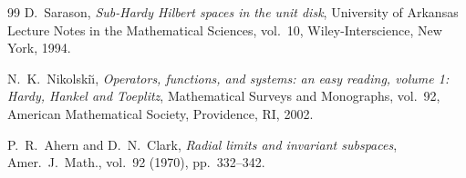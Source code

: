 \documentclass[11pt]{article}
\theoremstyle{plain}
\theoremstyle{definition}
\theoremstyle{remark}
\begin{document}
\begin{thebibliography}{99}
D.~Sarason,
\emph{Sub-Hardy Hilbert spaces in the unit disk},
University of Arkansas Lecture Notes in the Mathematical Sciences, vol.~10,
Wiley-Interscience, New York, 1994.

N.~K.~Nikol\textquotesingle ski\u\i,
\emph{Operators, functions, and systems: an easy reading,
volume 1: Hardy, Hankel and Toeplitz},
Mathematical Surveys and Monographs, vol.~92,
American Mathematical Society, Providence, RI, 2002.

P.~R.~Ahern and D.~N.~Clark,
\emph{Radial limits and invariant subspaces},
Amer.\ J.\ Math., vol.~92 (1970), pp.~332--342.

\end{thebibliography}
\end{document}
